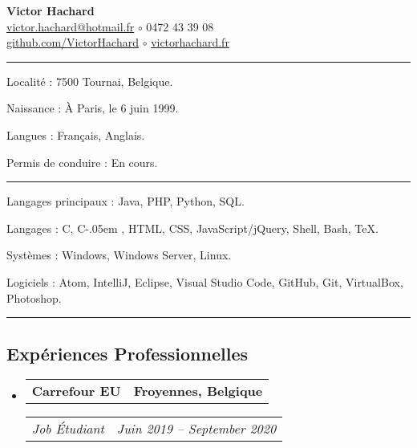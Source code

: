 \documentclass[10pt,letterpaper]{article}
\makeatletter
\newcommand{\Csharp}{%
  {\settoheight{\dimen0}{C}C\kern-.05em \resizebox{!}{\dimen0}{\raisebox{\depth}{\#}}}}
\newenvironment{indentsection}[1]
{\begin{list}{}
  {\setlength{\leftmargin}{#1}} \item[]
}
{\end{list}}
\newcommand{\headerrow}[2]
{\begin{tabular*}{\linewidth}{l@{\extracolsep{\fill}}r}
  #1 &
  #2 \\
\end{tabular*}}
\makeatother
\begin{document}
\begin{center}
  \huge \textbf{Victor Hachard} \\
  \large
  \href{mailto:victor.hachard@hotmail.fr}{victor.hachard@hotmail.fr}
  $\circ$
  0472 43 39 08
  \\
  \href{http://www.github.com/VictorHachard}{github.com/VictorHachard}
  $\circ$
  \href{http://www.victorhachard.fr}{victorhachard.fr} 
  \vspace{-0.2em}
\end{center}


\hrule
\begin{indentsection}{\parindent}
\begin{description*}
  \item[Localité :] 7500 Tournai, Belgique.
  \item[Naissance :] À Paris, le 6 juin 1999.
  \item[Langues :] Français, Anglais.
  \item[Permis de conduire :] En cours.
\end{description*}
\end{indentsection}


\hrule
\begin{indentsection}{\parindent}
\begin{description*}
  \item[Langages principaux :] Java, PHP, Python, SQL.
  \item[Langages :]  C, \Csharp, HTML, CSS,  JavaScript/jQuery, Shell,
  Bash, TeX.
  \item[Systèmes :] Windows, Windows Server, Linux.
  \item[Logiciels :] Atom, IntelliJ, Eclipse, Visual Studio Code, GitHub, Git,
  VirtualBox, Photoshop.
\end{description*}
\end{indentsection}


\hrule
\vspace{-0.4em}
\subsection*{Expériences Professionnelles}
\begin{itemize}
  \parskip=0.1em

  \item
  \headerrow
    {\textbf{Carrefour EU}}
    {\textbf{Froyennes, Belgique}}
  \headerrow
    {\emph{Job Étudiant}}
    {\emph{Juin 2019 -- September 2020}}
  \end{itemize}
\end{document}
